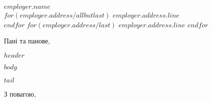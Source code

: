 \documentclass[11pt,a4paper]{letter}
\begin{document}
 
\begin{letter}{$employer.name$ \\ $for(employer.address/allbutlast)$ $employer.address.line$ \\ $endfor$ $for(employer.address/last)$ $employer.address.line$ $endfor$} 
\opening{Пані та панове,} 

\indent $header$

\indent $body$

\indent $tail$

\closing{З повагою,\\
 \\
}
 
\end{letter} 
\end{document}

